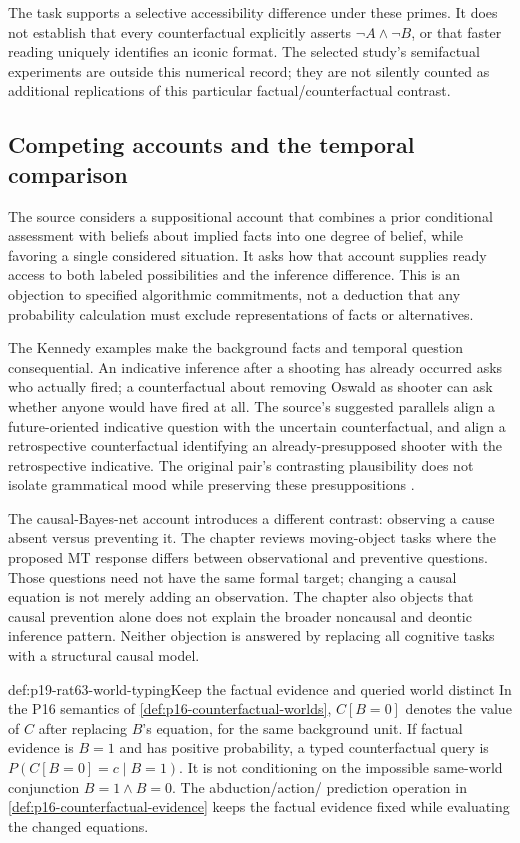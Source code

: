 The task supports a selective accessibility difference under these
primes. It does not establish that every counterfactual explicitly
asserts \(\neg A\land\neg B\), or that faster reading uniquely
identifies an iconic format. The selected study's semifactual experiments
are outside this numerical record; they are not silently counted as
additional replications of this particular factual/counterfactual contrast.

\subsection{Competing accounts and the temporal comparison}

The source considers a suppositional account that combines a prior
conditional assessment with beliefs about implied facts into one degree
of belief, while favoring a single considered situation. It asks how that
account supplies ready access to both labeled possibilities and the
inference difference. This is an objection to specified algorithmic
commitments, not a deduction that any probability calculation must
exclude representations of facts or alternatives.

The Kennedy examples make the background facts and temporal question
consequential. An indicative inference after a shooting has already
occurred asks who actually fired; a counterfactual about removing
Oswald as shooter can ask whether anyone would have fired at all.
The source's suggested parallels align a future-oriented indicative
question with the uncertain counterfactual, and align a retrospective
counterfactual identifying an already-presupposed shooter with the
retrospective indicative. The original pair's contrasting plausibility
does not isolate grammatical mood while preserving these presuppositions
\cite[p.~413]{ByrneEspino2021ConditionalCounterfactual}.

The causal-Bayes-net account introduces a different contrast: observing
a cause absent versus preventing it. The chapter reviews moving-object
tasks where the proposed MT response differs between observational and
preventive questions. Those questions need not have the same formal
target; changing a causal equation is not merely adding an observation.
The chapter also objects that causal prevention alone does not explain
the broader noncausal and deontic inference pattern. Neither objection
is answered by replacing all cognitive tasks with a structural causal
model.

\begin{hbconvention}{def:p19-rat63-world-typing}{Keep the factual evidence and queried world distinct}
In the P16 semantics of \cref{def:p16-counterfactual-worlds},
\(C[B=0]\) denotes the value of \(C\) after replacing \(B\)'s
equation, for the same background unit. If factual evidence is \(B=1\)
and has positive probability, a typed counterfactual query is
\(P(C[B=0]=c\mid B=1)\). It is not conditioning on the impossible
same-world conjunction \(B=1\land B=0\). The abduction/action/
prediction operation in \cref{def:p16-counterfactual-evidence} keeps
the factual evidence fixed while evaluating the changed equations.
\end{hbconvention}


